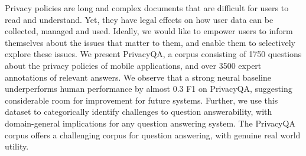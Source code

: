 Privacy policies are long and complex documents that are difficult for users to read and understand. Yet, they have legal effects on how user data can be collected, managed and used.  Ideally, we would like to empower users to inform themselves about the issues that matter to them, and enable them to selectively explore these issues. We present PrivacyQA, a corpus consisting of 1750 questions about the privacy policies of mobile applications, and over 3500 expert annotations of relevant answers. We observe that a strong neural baseline underperforms human performance by almost 0.3 F1 on PrivacyQA, suggesting considerable room for improvement for future systems. Further, we use this dataset to categorically identify challenges to question answerability, with domain-general implications for any question answering system.  The PrivacyQA corpus offers a challenging corpus for question answering, with genuine real world utility.